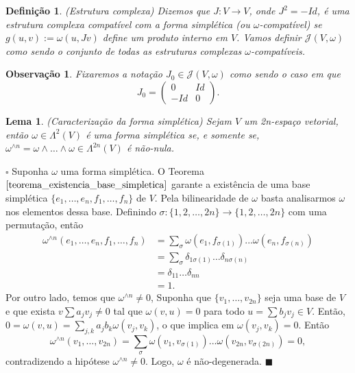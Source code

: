 \documentclass[12pt]{book}
\newtheorem{lema}[teorema]{Lema}
\newtheorem{definicao}[teorema]{Definição}
\newtheorem{observacao}[teorema]{Observação}
\newenvironment{prova}[1]{$\square$ #1}{\hfill$\blacksquare$}
\newcommand{\estruturacomplexa}{J_{0}}
\newcommand{\estruturascomplexaspadrao}{\mathcal{J}(V, \omega)}
\begin{document}
	\begin{definicao}\label{definicao_estrutura_complexa}
		(Estrutura complexa) Dizemos que $J: V \to V$, onde $J^{2} = -Id$, é uma estrutura complexa compatível com a forma simplética (ou $\omega$-compatível) se $g(u,v):=\omega(u, Jv)$ define um produto interno em $V$. Vamos definir $\estruturascomplexaspadrao$ como sendo o conjunto de todas as estruturas complexas $\omega$-compatíveis.
	\end{definicao}
	
	\begin{observacao}\label{observacao_estrutura_complexa}
		Fixaremos a notação $\estruturacomplexa \in \estruturascomplexaspadrao$ como sendo o caso em que
		$$
		\estruturacomplexa=
		\left(
		\begin{array}{cc}
		0 & Id
		\\
		-Id & 0
		\end{array}
		\right).
		$$
	\end{observacao}
	
	\begin{lema}
		(Caracterização da forma simplética) Sejam $V$ um 2n-espaço vetorial, então $\omega \in \Lambda^{2}(V)$ é uma forma simplética se, e somente se, $\omega^{\wedge n} = \omega\wedge \dots \wedge \omega \in \Lambda^{2n}(V)$ é não-nula.
	\end{lema}
	\begin{prova}
		Suponha $\omega$ uma forma simplética. O Teorema $\ref{teorema_existencia_base_simpletica}$ garante a existência de uma base simplética $\{e_{1}, \dots, e_{n}, f_{1}, \dots, f_{n}\}$ de $V$. Pela bilinearidade de $\omega$ basta analisarmos $\omega$ nos elementos dessa base. Definindo $\sigma:\{1, 2, \dots , 2n\} \to \{1, 2, \dots , 2n\}$ com uma permutação, então
		$$
		\begin{aligned}
		\omega^{\wedge n}(e_{1}, \dots, e_{n}, f_{1}, \dots, f_{n}) &=\sum_{\sigma} \omega(e_{1}, f_{\sigma(1)})...\omega(e_{n}, f_{\sigma(n)})
		\\
		&= \sum_{\sigma}\delta_{1\sigma(1)}\dots\delta_{n\sigma(n)}
		\\
		&= \delta_{11}\dots\delta_{nn}
		\\
		&= 1.
		\end{aligned}
		$$
		Por outro lado, temos que $\omega^{\wedge n} \neq 0$, Suponha que $\{v_{1},\dots, v_{2n}\}$ seja uma base de $V$ e que exista $v \sum a_{j}v_{j} \neq 0$ tal que $\omega(v, u) = 0$ para todo $u=\sum b_{j}v_{j}  \in V$. Então, $0=\omega(v, u ) = \sum_{j, k} a_{j}b_{k}\omega(v_{j}, v_{k})$, o que implica em $\omega(v_{j}, v_{k}) =0$. Então 
		$$
		\omega^{\wedge n}(v_{1},\dots, v_{2n}) = \sum_{\sigma} \omega(v_{1}, v_{\sigma(1)})...\omega(v_{2n}, v_{\sigma(2n)})=0,
		$$
		contradizendo a hipótese $\omega^{\wedge n} \neq 0$. Logo, $\omega$ é não-degenerada.
	\end{prova}
	
\end{document}
